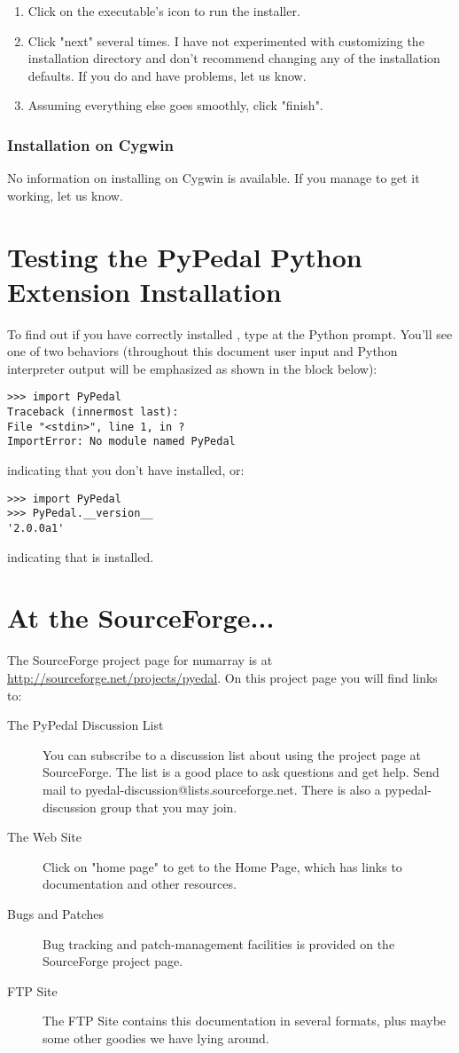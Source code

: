 \begin{enumerate}
\item Click on the executable's icon to run the installer.
\item Click "next" several times.  I have not experimented with customizing the installation directory and don't recommend changing any of the installation defaults.  If you do and have problems, let us know.
\item Assuming everything else goes smoothly, click "finish".
\end{enumerate}


\subsubsection{Installation on Cygwin}

No information on installing \PYPEDAL{} on Cygwin is available.  If you manage to get it working, let us know.


\section{Testing the PyPedal Python Extension Installation}

To find out if you have correctly installed \PYPEDAL{}, type  at the Python prompt. You'll see one of
two behaviors (throughout this document user input and Python interpreter output will be emphasized as shown in the block below):
\begin{verbatim}
>>> import PyPedal
Traceback (innermost last):
File "<stdin>", line 1, in ?
ImportError: No module named PyPedal
\end{verbatim}
indicating that you don't have \PYPEDAL{} installed, or:
\begin{verbatim}
>>> import PyPedal
>>> PyPedal.__version__
'2.0.0a1'
\end{verbatim}
indicating that \PYPEDAL{} is installed.


\section{At the SourceForge...}
\label{sec:at-sourceforge}

The SourceForge project page for numarray is at
\url{http://sourceforge.net/projects/pyedal}. On this project page you will find
links to:
\begin{description}
\item[The PyPedal Discussion List] You can subscribe to a discussion list about \PYPEDAL{} using the project page at SourceForge. The list is a good place to ask questions and get help. Send mail to pyedal-discussion@lists.sourceforge.net.  There is also a pypedal-discussion group that you may join.
\item[The Web Site] Click on "home page" to get to the \PYPEDAL{} Home Page, which has links to documentation and other resources.
\item[Bugs and Patches] Bug tracking and patch-management facilities is provided on the SourceForge project page.
\item[FTP Site] The FTP Site contains this documentation in several formats, plus maybe some other goodies we have lying around.
\end{description}